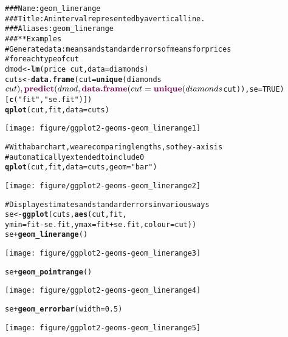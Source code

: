 \documentclass[a4paper,titlepage]{tufte-handout}\usepackage{graphicx, color}
\makeatletter
\def\maxwidth{ %
  \ifdim\Gin@nat@width>\linewidth
    \linewidth
  \else
    \Gin@nat@width
  \fi
}
\newcommand{\hlfunctioncall}[1]{\textcolor[rgb]{0.501960784313725,0,0.329411764705882}{\textbf{#1}}}%
\newcommand{\hlstring}[1]{\textcolor[rgb]{0.6,0.6,1}{#1}}%
\newcommand{\hlcomment}[1]{\textcolor[rgb]{0.180392156862745,0.6,0.341176470588235}{#1}}%
\newenvironment{kframe}{%
 \def\at@end@of@kframe{}%
 \ifinner\ifhmode%
  \def\at@end@of@kframe{\end{minipage}}%
  \begin{minipage}{\columnwidth}%
 \fi\fi%
 \def\FrameCommand##1{\hskip\@totalleftmargin \hskip-\fboxsep
 \colorbox{shadecolor}{##1}\hskip-\fboxsep
     \hskip-\linewidth \hskip-\@totalleftmargin \hskip\columnwidth}%
 \MakeFramed {\advance\hsize-\width
   \@totalleftmargin\z@ \linewidth\hsize
   \@setminipage}}%
 {\par\unskip\endMakeFramed%
 \at@end@of@kframe}
\newenvironment{knitrout}{}{} %
\makeatother
\begin{document}
\begin{knitrout}
\color{fgcolor}\begin{kframe}
\begin{alltt}
\hlcomment{### Name: geom_linerange}
\hlcomment{### Title: An interval represented by a vertical line.}
\hlcomment{### Aliases: geom_linerange}
\hlcomment{### ** Examples}
\hlcomment{# Generate data: means and standard errors of means for prices}
\hlcomment{# for each type of cut}
dmod <- \hlfunctioncall{lm}(price ~ cut, data=diamonds)
cuts <- \hlfunctioncall{data.frame}(cut=\hlfunctioncall{unique}(diamonds$cut), \hlfunctioncall{predict}(dmod, \hlfunctioncall{data.frame}(cut = \hlfunctioncall{unique}(diamonds$cut)), se=TRUE)[\hlfunctioncall{c}(\hlstring{"fit"},\hlstring{"se.fit"})])
\hlfunctioncall{qplot}(cut, fit, data=cuts)
\end{alltt}
\end{kframe}\texttt{[image: figure/ggplot2-geoms-geom\_linerange1]} \begin{kframe}\begin{alltt}
\hlcomment{# With a bar chart, we are comparing lengths, so the y-axis is}
\hlcomment{# automatically extended to include 0}
\hlfunctioncall{qplot}(cut, fit, data=cuts, geom=\hlstring{"bar"})
\end{alltt}
\end{kframe}\texttt{[image: figure/ggplot2-geoms-geom\_linerange2]} \begin{kframe}\begin{alltt}
\hlcomment{# Display estimates and standard errors in various ways}
se <- \hlfunctioncall{ggplot}(cuts, \hlfunctioncall{aes}(cut, fit,
  ymin = fit - se.fit, ymax=fit + se.fit, colour = cut))
se + \hlfunctioncall{geom_linerange}()
\end{alltt}
\end{kframe}\texttt{[image: figure/ggplot2-geoms-geom\_linerange3]} \begin{kframe}\begin{alltt}
se + \hlfunctioncall{geom_pointrange}()
\end{alltt}
\end{kframe}\texttt{[image: figure/ggplot2-geoms-geom\_linerange4]} \begin{kframe}\begin{alltt}
se + \hlfunctioncall{geom_errorbar}(width = 0.5)
\end{alltt}
\end{kframe}\texttt{[image: figure/ggplot2-geoms-geom\_linerange5]} \begin{kframe}\begin{alltt}

\end{alltt}
\end{kframe}
\end{knitrout}
\end{document}
